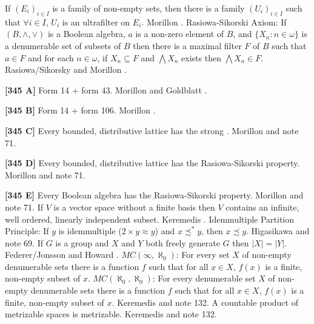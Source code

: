   If $(E_i)_{i\in I}$ is a family of non-empty
sets, then there is a family $(U_i)_{i\in I}$ such that $\forall i\in I$,
$U_i$ is an ultrafilter on $E_i$.  \ac{Morillon} \cite{1988}.
\medskip
{}  Rasiowa-Sikorski Axiom:  If $(B,\land,\lor)$
is a Boolean algebra, $a$ is a non-zero element of $B$, and
$\{X_n: n\in\omega\}$ is a denumerable set of subsets of $B$ then
there is a maximal filter $F$ of $B$ such that $a\in F$ and for
each $n\in\omega$, if $X_n\subseteq F$ and $\bigwedge X_n$ exists then
$\bigwedge X_n \in F$. \ac{Rasiowa/Sikorsky} \cite{1950} and  \ac{Morillon}
\cite{1988}.
\smallskip
\item{}{\bf [345 A]}  Form 14 + form 43.  \ac{Morillon} \cite{1988}
and \ac{Goldblatt} \cite{1985}.
\smallskip
\item{}{\bf [345 B]}  Form 14 + form 106.  \ac{Morillon} \cite{1988}.
\smallskip
\item{}{\bf [345 C]}  Every bounded, distributive lattice has the strong
.  \ac{Morillon} \cite{1988} and note 71.
\smallskip
\item{}{\bf [345 D]}  Every bounded, distributive lattice has the
Rasiowa-Sikorski property.  \ac{Morillon} \cite{1988} and note 71.
\smallskip
\item{}{\bf [345 E]}  Every Boolean algebra has the Rasiowa-Sikorski
property.  \ac{Morillon} \cite{1988} and note 71.
\medskip
{}  If $V$ is a vector space without a finite basis
then $V$ contains an infinite, well ordered, linearly independent subset.
Keremedis \cite{2001a}.
\medskip
{} Idemmultiple Partition Principle: If $y$ is
idemmultiple ($2\times y\approx y$) and $x\precsim ^* y$, then
$x\precsim y$. \ac{Higasikawa} \cite{1995} and note 69.
\medskip
{}  If $G$ is a group and $X$ and $Y$ both
freely generate $G$ then $|X| = |Y|$.  \ac{Federer/Jonsson} \cite{1950}
and \ac{Howard} \cite{1985}.
\medskip
{} $MC(\infty,\aleph_0)$: For every set $X$ of
non-empty denumerable sets there is a function $f$ such that for all
$x\in X$, $f(x)$ is a finite, non-empty subset of $x$.
\medskip
{} $MC(\aleph_0,\aleph_0)$: For every denumerable
set $X$ of non-empty denumerable sets there is a function $f$ such that
for all $x\in X$, $f(x)$ is a finite, non-empty subset of $x$.
\ac{Keremedis} \cite{1996b} and note 132.
\medskip
{} A countable product of metrizable spaces
is metrizable. \ac{Keremedis} \cite{1996b} and note 132.
